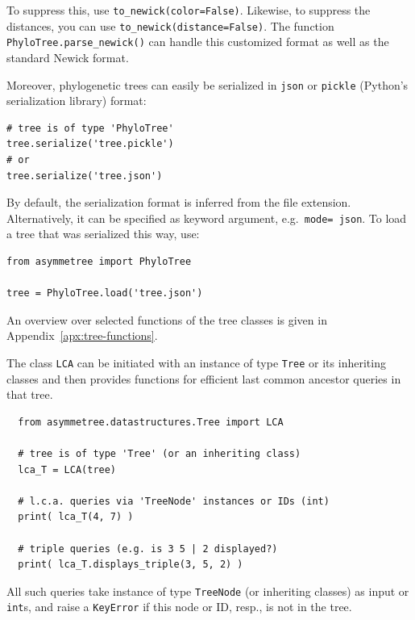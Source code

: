 \documentclass[hidelinks,11pt]{article}
\newcommand{\sq}{\textquotesingle}
\begin{document}
\noindent
To suppress this, use \texttt{to\_newick(color=False)}. Likewise, to suppress the distances, you can use \texttt{to\_newick(distance=False)}.
The function \texttt{PhyloTree.parse\_newick()} can handle this customized format as well as the standard Newick format.

Moreover, phylogenetic trees can easily be serialized in \texttt{json} or \texttt{pickle} (Python's serialization library) format:

\begin{adjustwidth}{1cm}{1cm}\vspace{2mm}
\begin{verbatim}
# tree is of type 'PhyloTree'
tree.serialize('tree.pickle')
# or
tree.serialize('tree.json')
\end{verbatim}
\end{adjustwidth}

\noindent
By default, the serialization format is inferred from the file extension.
Alternatively, it can be specified as keyword argument, e.g.\ \texttt{mode=\sq
json\sq}.
To load a tree that was serialized this way, use:

\begin{adjustwidth}{1cm}{1cm}\vspace{2mm}
\begin{verbatim}
from asymmetree import PhyloTree

tree = PhyloTree.load('tree.json')
\end{verbatim}
\end{adjustwidth}

An overview over selected functions of the tree classes is given in 
Appendix~\ref{apx:tree-functions}.

The class \texttt{LCA} can be initiated with an instance of type \texttt{Tree} 
or its inheriting classes and then provides functions for efficient last common 
ancestor queries in that tree. 

\begin{adjustwidth}{1cm}{1cm}\vspace{2mm}
  \begin{verbatim}
  from asymmetree.datastructures.Tree import LCA
  
  # tree is of type 'Tree' (or an inheriting class)
  lca_T = LCA(tree)
  
  # l.c.a. queries via 'TreeNode' instances or IDs (int)
  print( lca_T(4, 7) )
  
  # triple queries (e.g. is 3 5 | 2 displayed?)
  print( lca_T.displays_triple(3, 5, 2) )
  \end{verbatim}
\end{adjustwidth}
All such queries take instance of type \texttt{TreeNode} (or inheriting 
classes) as 
input or \texttt{int}s, and raise a \texttt{KeyError} if this node or ID, 
resp., is not in the tree.
\end{document}
